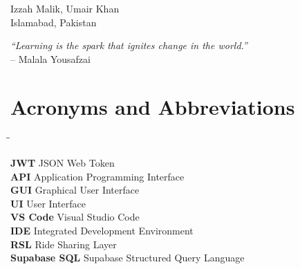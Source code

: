 \documentclass[12pt]{report}
\begin{document}
\vspace{4\baselineskip}

Izzah Malik, Umair Khan\\
Islamabad, Pakistan

\clearpage

\vspace*{\fill}
\begin{center}
\textit{“Learning is the spark that ignites change in the world.”}\\
\hfill -- Malala Yousafzai
\end{center}
\vspace*{\fill}
\clearpage

\tableofcontents
\clearpage
\listoffigures
\clearpage
\listoftables
\cleardoublepage

\chapter*{Acronyms and Abbreviations}

\vspace{1cm}

\begin{tabbing}
\hspace{4cm}\=\hspace{8cm}\=\kill

\textbf{JWT} \> JSON Web Token \\
\textbf{API} \> Application Programming Interface \\
\textbf{GUI} \> Graphical User Interface \\
\textbf{UI} \> User Interface \\
\textbf{VS Code} \> Visual Studio Code \\
\textbf{IDE} \> Integrated Development Environment \\
\textbf{RSL} \> Ride Sharing Layer \\
\textbf{Supabase SQL} \> Supabase Structured Query Language \\
\end{tabbing}
\clearpage
{}


\pagestyle{fancy}

\fancyhf{}
\end{document}
